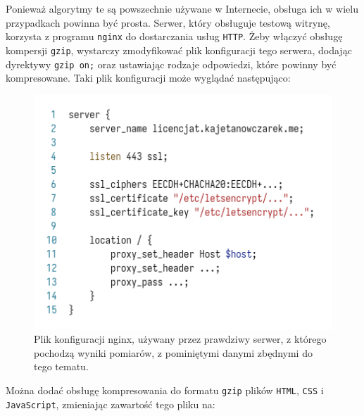 \documentclass[licencjacka]{pracadypl}
\begin{document}
Ponieważ algorytmy te są powszechnie używane w Internecie, obsługa ich w wielu przypadkach powinna być prosta. Serwer, który obsługuje testową witrynę, korzysta z programu \texttt{nginx} do dostarczania usług \texttt{HTTP}. Żeby włączyć obsługę kompersji \texttt{gzip}, wystarczy zmodyfikować plik konfiguracji tego serwera, dodając dyrektywy \texttt{gzip on;} oraz ustawiając rodzaje odpowiedzi, które powinny być kompresowane. Taki plik konfiguracji może wyglądać następująco:
\begin{figure}[H]
  \centering
  \includegraphics[width=\linewidth/\real{1.55}]{images/code-nginx-conf-trunc-nogzip.png}
  \caption{Plik konfiguracji nginx, używany przez prawdziwy serwer, z którego pochodzą wyniki pomiarów, z pominiętymi danymi zbędnymi do tego tematu.}
  \label{fig:nginx-before-gzip}
\end{figure}
Można dodać obsługę kompresowania do formatu \texttt{gzip} plików \texttt{HTML}, \texttt{CSS} i \texttt{JavaScript}, zmieniając zawartość tego pliku na:
\end{document}
